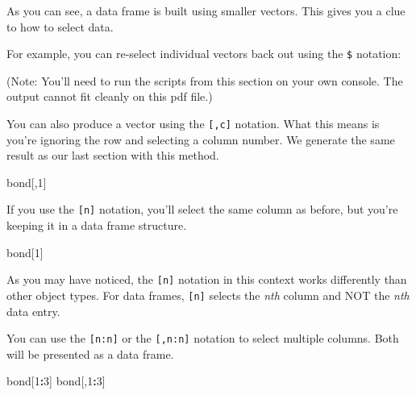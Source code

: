 \documentclass[
]{book}
\newenvironment{Shaded}{\begin{snugshade}}{\end{snugshade}}
\newcommand{\DecValTok}[1]{\textcolor[rgb]{0.00,0.00,0.81}{#1}}
\newcommand{\NormalTok}[1]{#1}
\newcommand{\OperatorTok}[1]{\textcolor[rgb]{0.81,0.36,0.00}{\textbf{#1}}}
\begin{document}
\begin{center}
As you can see, a data frame is built using smaller vectors. This gives you a clue to how to select data.

For example, you can re-select individual vectors back out using the \texttt{\$} notation:

\begin{Shaded}
\end{Shaded}

(Note: You'll need to run the scripts from this section on your own console. The output cannot fit cleanly on this pdf file.)

You can also produce a vector using the \texttt{{[},c{]}} notation. What this means is you're ignoring the row and selecting a column number. We generate the same result as our last section with this method.

\begin{Shaded}
\begin{Highlighting}[]
\NormalTok{bond[,}\DecValTok{1}\NormalTok{]}
\end{Highlighting}
\end{Shaded}

If you use the \texttt{{[}n{]}} notation, you'll select the same column as before, but you're keeping it in a data frame structure.

\begin{Shaded}
\begin{Highlighting}[]
\NormalTok{bond[}\DecValTok{1}\NormalTok{]}
\end{Highlighting}
\end{Shaded}

As you may have noticed, the \texttt{{[}n{]}} notation in this context works differently than other object types. For data frames, \texttt{{[}n{]}} selects the \emph{nth} column and NOT the \emph{nth} data entry.

You can use the \texttt{{[}n:n{]}} or the \texttt{{[},n:n{]}} notation to select multiple columns. Both will be presented as a data frame.

\begin{Shaded}
\begin{Highlighting}[]
\NormalTok{bond[}\DecValTok{1}\OperatorTok{:}\DecValTok{3}\NormalTok{]}
\NormalTok{bond[,}\DecValTok{1}\OperatorTok{:}\DecValTok{3}\NormalTok{]}
\end{Highlighting}
\end{Shaded}


\end{center}
\end{document}
